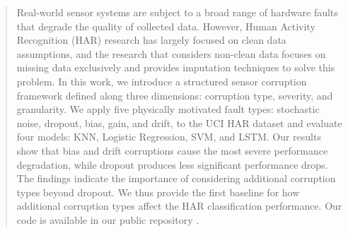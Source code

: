 \begin{abstract}

Real-world sensor systems are subject to a broad range of hardware faults that degrade the quality
of collected data. However, Human Activity Recognition (HAR) research has largely focused on
clean data assumptions, and the research that considers non-clean data focuses on missing data
exclusively and provides imputation techniques to solve this problem. In this work, we introduce
a structured sensor corruption framework defined along three dimensions: corruption type, severity,
and granularity. We apply five physically motivated fault types: stochastic noise, dropout, bias,
gain, and drift, to the UCI HAR dataset and evaluate four models: KNN, Logistic Regression, SVM,
and LSTM. Our results show that bias and drift corruptions cause the most severe performance
degradation, while dropout produces less significant performance drops. The findings indicate the
importance of considering additional corruption types beyond dropout. We thus provide the
first baseline for how additional corruption types affect the HAR classification performance.
Our code is available in our public repository \cite{sensor-corruption-repo}.

\end{abstract}
